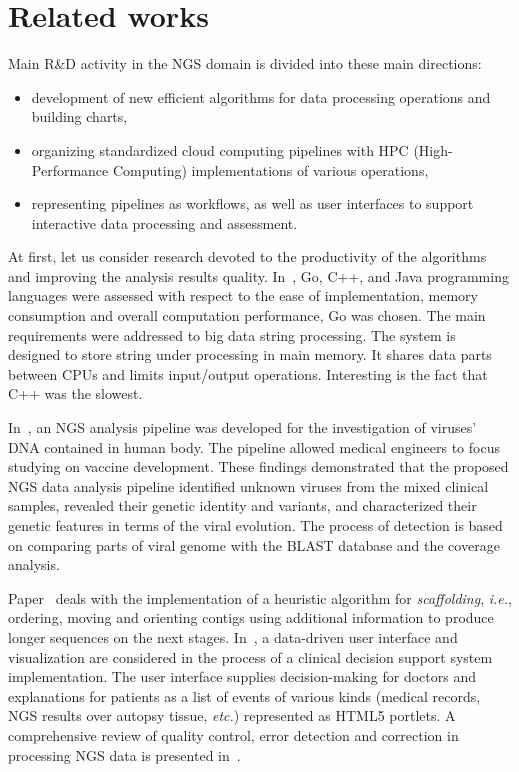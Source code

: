 \documentclass[a4paper]{jpconf}
\begin{document}
\section{Related works}\label{sec:relworks}

Main R\&D activity in the NGS domain is divided into these main directions:
\begin{itemize}
\item development of new efficient algorithms for data processing operations and building charts,
\item organizing standardized cloud computing pipelines with HPC (High-Performance Computing) implementations of various operations,
\item representing pipelines as workflows, as well as user interfaces to support interactive data processing and assessment.
\end{itemize}

At first, let us consider research devoted to the productivity of the algorithms and improving the analysis results quality.  In~\cite{const19}, Go, C++, and Java programming languages were assessed with respect to the ease of implementation, memory consumption and overall computation performance, Go was chosen. The main requirements were addressed to big data string processing. The system is designed to store string under processing in main memory. It shares data parts between CPUs and limits input/output operations. Interesting is the fact that C++ was the slowest.

In~\cite{Gong16}, an NGS analysis pipeline was developed for the investigation of viruses' DNA contained in human body. The pipeline allowed medical engineers to focus studying on vaccine development. These findings demonstrated that the proposed NGS data analysis pipeline identified unknown viruses from the mixed clinical samples, revealed their genetic identity and variants, and characterized their genetic features in terms of the viral evolution. The process of detection is based on comparing parts of viral genome with the BLAST database and the coverage analysis.

Paper~\cite{grass12} deals with the implementation of a heuristic algorithm for \emph{scaffolding}, \emph{i.e.}, ordering, moving and orienting contigs using additional information to produce longer sequences on the next stages.  In~\cite{muller16}, a data-driven user interface and visualization are considered in the process of a clinical decision support system implementation. The user interface supplies decision-making for doctors and explanations for patients as a list of events of various kinds (medical records, NGS results over autopsy tissue, \emph{etc.}) represented as HTML5 portlets.  A comprehensive review of quality control, error detection and correction in processing NGS data is presented in~\cite{te16}. %
\end{document}

